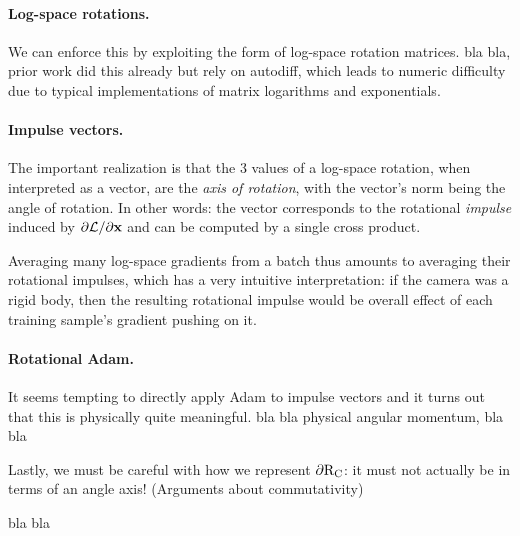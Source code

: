 \documentclass[acmtog,authorversion,nonacm]{acmart}
\begin{document}
\paragraph{Log-space rotations.}
We can enforce this by exploiting the form of log-space rotation matrices. bla bla, prior work did this already but rely on autodiff, which leads to numeric difficulty due to typical implementations of matrix logarithms and exponentials.

\paragraph{Impulse vectors.}
The important realization is that the 3 values of a log-space rotation, when interpreted as a vector, are the \emph{axis of rotation}, with the vector's norm being the angle of rotation.
In other words: the vector corresponds to the rotational \emph{impulse} induced by $\partial{\mathcal{L}} / \partial{\mathbf{x}}$ and can be computed by a single cross product.

Averaging many log-space gradients from a batch thus amounts to averaging their rotational impulses, which has a very intuitive interpretation: if the camera was a rigid body, then the resulting rotational impulse would be overall effect of each training sample's gradient pushing on it.

\paragraph{Rotational Adam.}
It seems tempting to directly apply Adam to impulse vectors and it turns out that this is physically quite meaningful.
bla bla physical angular momentum, bla bla

Lastly, we must be careful with how we represent $\partial{\mathrm{R}_{\mathrm{C}}}$: it must not actually be in terms of an angle axis! (Arguments about commutativity)


\begin{acks}
bla bla
\end{acks}




\end{document}
